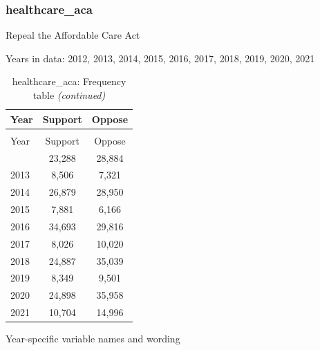 \documentclass[
  12pt]{article}
\begin{document}
\hypertarget{healthcare_aca}{%
\subsubsection{healthcare\_aca}\label{healthcare_aca}}

Repeal the Affordable Care Act

Years in data: 2012, 2013, 2014, 2015, 2016, 2017, 2018, 2019, 2020,
2021\begingroup\fontsize{10}{12}\selectfont

\begin{longtable}[t]{lcc}
\caption{\label{tab:unnamed-chunk-5}healthcare\_aca: Frequency table}\\
\toprule
Year & Support & Oppose\\
\midrule
\endfirsthead
\caption[]{healthcare\_aca: Frequency table \textit{(continued)}}\\
\toprule
Year & Support & Oppose\\
\midrule
\endhead

\endfoot
\bottomrule
\endlastfoot
2012 & 23,288 & 28,884\\
2013 & 8,506 & 7,321\\
2014 & 26,879 & 28,950\\
2015 & 7,881 & 6,166\\
2016 & 34,693 & 29,816\\
2017 & 8,026 & 10,020\\
2018 & 24,887 & 35,039\\
2019 & 8,349 & 9,501\\
2020 & 24,898 & 35,958\\
2021 & 10,704 & 14,996\\*
\end{longtable}
\endgroup{}

Year-specific variable names and
wording\begingroup\fontsize{11}{13}\selectfont
\end{document}
